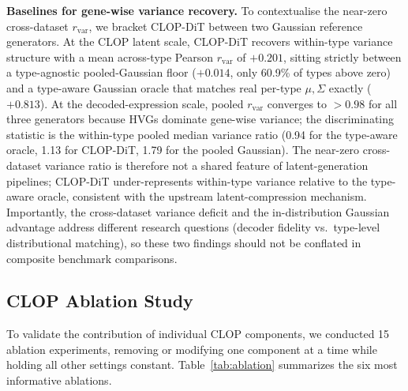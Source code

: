 \documentclass[11pt,a4paper]{article}
\begin{document}
\textbf{Baselines for gene-wise variance recovery.} To contextualise the near-zero cross-dataset $r_\text{var}$, we bracket CLOP-DiT between two Gaussian reference generators. At the CLOP latent scale, CLOP-DiT recovers within-type variance structure with a mean across-type Pearson $r_\text{var}$ of $+0.201$, sitting strictly between a type-agnostic pooled-Gaussian floor ($+0.014$, only 60.9\% of types above zero) and a type-aware Gaussian oracle that matches real per-type $\mu, \Sigma$ exactly ($+0.813$). At the decoded-expression scale, pooled $r_\text{var}$ converges to $>0.98$ for all three generators because HVGs dominate gene-wise variance; the discriminating statistic is the within-type pooled median variance ratio (0.94 for the type-aware oracle, 1.13 for CLOP-DiT, 1.79 for the pooled Gaussian). The near-zero cross-dataset variance ratio is therefore not a shared feature of latent-generation pipelines; CLOP-DiT under-represents within-type variance relative to the type-aware oracle, consistent with the upstream latent-compression mechanism. Importantly, the cross-dataset variance deficit and the in-distribution Gaussian advantage address different research questions (decoder fidelity vs.\ type-level distributional matching), so these two findings should not be conflated in composite benchmark comparisons.

\subsection{CLOP Ablation Study}\label{sec:ablation}

To validate the contribution of individual CLOP components, we conducted 15 ablation experiments, removing or modifying one component at a time while holding all other settings constant. Table~\ref{tab:ablation} summarizes the six most informative ablations.
\end{document}
